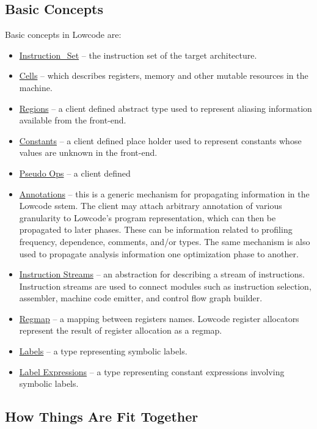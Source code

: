 \subsection{Basic Concepts}

  Basic concepts in Lowcode are: 
\begin{itemize}
    \item \href{instructions.html}{Instruction_Set} --
    the instruction set of the target architecture.
    \item \href{cells.html}{Cells} -- which describes registers,
memory and other mutable resources in the machine.
    \item \href{regions.html}{Regions} -- a client defined
   abstract type used to represent aliasing information available from
the front-end.
    \item \href{constants.html}{Constants} -- a client defined
   place holder used to represent constants whose values are unknown 
   in the front-end. 
    \item \href{pseudo-ops.html}{Pseudo Ops} -- a client defined
      
    \item \href{annotations.html}{Annotations} -- this is
   a generic mechanism for propagating information in the Lowcode sstem.
   The client may attach arbitrary annotation of various granularity 
   to Lowcode's program representation,
   which can then be propagated to later phases.
   These can be information related to profiling frequency, dependence, 
   comments, and/or types.
   The same mechanism is also used to propagate 
   analysis information one optimization phase to 
   another.
    \item \href{streams.html}{Instruction Streams} -- an abstraction
   for describing a stream of instructions.  Instruction streams are
   used to connect modules such as instruction selection,  assembler, 
   machine code emitter, and 
   control flow graph builder.
   \item \href{regmap.html}{Regmap} -- a mapping between registers
     names.  Lowcode register allocators represent the result of register
   allocation as a regmap.
   \item \href{labels.html}{Labels} -- a type representing
symbolic labels.
   \item \href{labelexp.html}{Label Expressions} -- a type representing
     constant expressions
    involving symbolic labels.
\end{itemize}

\subsection{How Things Are Fit Together}

